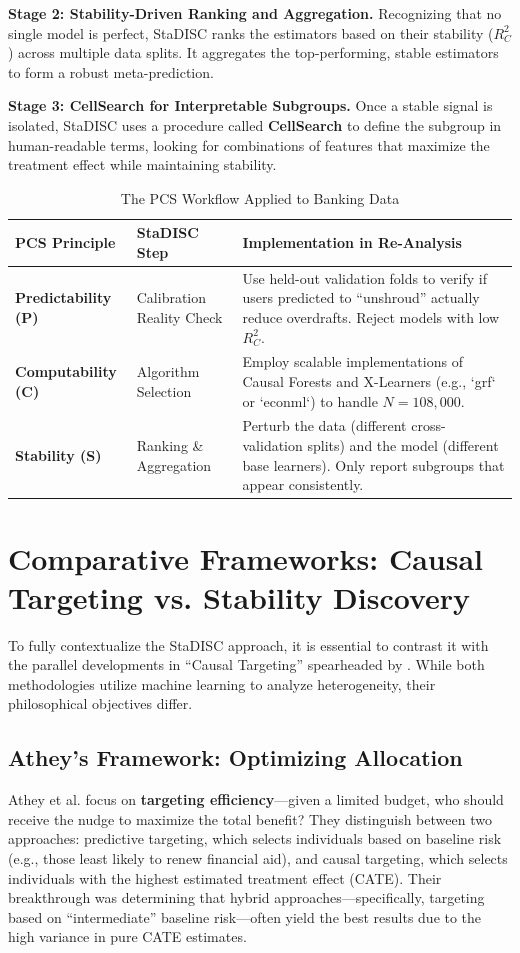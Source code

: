 \documentclass[11pt,a4paper]{article}
\begin{document}
	\textbf{Stage 2: Stability-Driven Ranking and Aggregation.} Recognizing that no single model is perfect, StaDISC ranks the estimators based on their stability ($R^2_C$) across multiple data splits. It aggregates the top-performing, stable estimators to form a robust meta-prediction.
	
	\textbf{Stage 3: CellSearch for Interpretable Subgroups.} Once a stable signal is isolated, StaDISC uses a procedure called \textbf{CellSearch} to define the subgroup in human-readable terms, looking for combinations of features that maximize the treatment effect while maintaining stability.
	
	\begin{table}[H]
		\centering
		\caption{The PCS Workflow Applied to Banking Data}
		\label{tab:pcs_workflow}
		\begin{tabular}{p{3cm} p{4cm} p{7cm}}
			\toprule
			\textbf{PCS Principle} & \textbf{StaDISC Step} & \textbf{Implementation in Re-Analysis} \\ 
			\midrule
			\textbf{Predictability (P)} & Calibration Reality Check & Use held-out validation folds to verify if users predicted to ``unshroud'' actually reduce overdrafts. Reject models with low $R^2_C$. \\ \addlinespace
			\textbf{Computability (C)} & Algorithm Selection & Employ scalable implementations of Causal Forests and X-Learners (e.g., `grf` or `econml`) to handle $N=108,000$. \\ \addlinespace
			\textbf{Stability (S)} & Ranking \& Aggregation & Perturb the data (different cross-validation splits) and the model (different base learners). Only report subgroups that appear consistently. \\ 
			\bottomrule
		\end{tabular}
	\end{table}
	
	\section{Comparative Frameworks: Causal Targeting vs. Stability Discovery}
	To fully contextualize the StaDISC approach, it is essential to contrast it with the parallel developments in ``Causal Targeting'' spearheaded by \citet{athey2023}. While both methodologies utilize machine learning to analyze heterogeneity, their philosophical objectives differ.
	
	\subsection{Athey's Framework: Optimizing Allocation}
	Athey et al. focus on \textbf{targeting efficiency}---given a limited budget, who should receive the nudge to maximize the total benefit? They distinguish between two approaches: predictive targeting, which selects individuals based on baseline risk (e.g., those least likely to renew financial aid), and causal targeting, which selects individuals with the highest estimated treatment effect (CATE). Their breakthrough was determining that hybrid approaches---specifically, targeting based on ``intermediate'' baseline risk---often yield the best results due to the high variance in pure CATE estimates.
	
\end{document}
